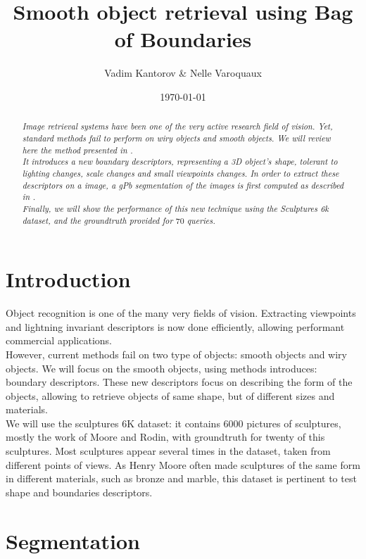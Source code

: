 \documentclass{article}
\date{\today}
\title{Smooth object retrieval using Bag of Boundaries}
\author{Vadim Kantorov \& Nelle Varoquaux}
\begin{document}
\maketitle
\begin{abstract}
\textit{Image retrieval systems have been one of the very active research
field of vision. Yet, standard methods fail to perform on wiry objects and
smooth objects. We will review here the method presented in
\cite{Arandjelovic11}.\\
It introduces a new boundary descriptors, representing a 3D object's shape,
tolerant to lighting changes, scale changes and small viewpoints changes. In
order to extract these descriptors on a image, a gPb segmentation of the images
is first computed as described in \cite{gpb}.\\
Finally, we will show the performance of this new technique using the
Sculptures 6k dataset, and the groundtruth provided for $70$ queries.}
\end{abstract}

\section{Introduction}
Object recognition is one of the many very fields of vision. Extracting
viewpoints and lightning invariant descriptors is now done efficiently,
allowing performant commercial applications. \\
However, current methods fail on two type of objects: smooth objects and wiry
objects. We will focus on the smooth objects, using methods
\cite{Arandjelovic11} introduces: boundary descriptors. These new descriptors
focus on describing the form of the objects, allowing to retrieve objects
of same shape, but of different sizes and materials. \\
We will use the sculptures 6K dataset: it contains $6000$ pictures of
sculptures, mostly the work of Moore and Rodin, with groundtruth for twenty
of this sculptures. Most sculptures appear several times in the dataset, taken
from different points of views. As Henry Moore often made sculptures of the
same form in different materials, such as bronze and marble, this dataset is
pertinent to test shape and boundaries descriptors.

\section{Segmentation}
\end{document}
